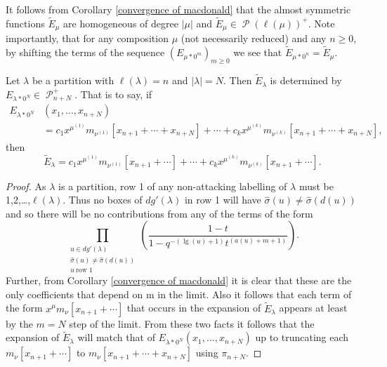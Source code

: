 \documentclass[ALCO,Unicode]{cedram}
\DeclareMathOperator{\sP}{\mathscr{P} }
\DeclareMathOperator{\mathleg}{lg}
\begin{document}
It follows from Corollary \ref{convergence of macdonald} that the almost symmetric functions $\widetilde{E}_{\mu}$ are homogeneous of degree $|\mu|$ and $\widetilde{E}_{\mu} \in \sP(\ell(\mu))^{+}.$ Note importantly, that for any composition $\mu$ (not necessarily reduced) and any $n \geq 0$, by shifting the terms of the sequence $(E_{\mu*0^m})_{m\geq 0}$ we see that $\widetilde{E}_{\mu *0^n} = \widetilde{E}_{\mu}$.



\begin{coro}\label{stabilizing of convergence of macdonald for partitions}
Let $\lambda$ be a partition with $\ell(\lambda) = n$ and $|\lambda| = N$. Then $\widetilde{E}_{\lambda}$ is determined by  $E_{\lambda*0^N} \in \sP_{n+N}^{+}$. That is to say, if 
\begin{align*}
E_{\lambda*0^{N}}&(x_1,\ldots,x_{n+N}) \\ &= c_1 x^{\mu^{(1)}}m_{\nu^{(1)}}[x_{n+1}+\cdots+x_{n+N}] + \cdots + c_k x^{\mu^{(k)}}m_{\nu^{(k)}}[x_{n+1}+ \cdots +x_{n+N}],
\end{align*}
then 
$$ \widetilde{E}_{\lambda} = c_1 x^{\mu^{(1)}}m_{\nu^{(1)}}[x_{n+1}+ \cdots] + \cdots + c_k x^{\mu^{(k)}}m_{\nu^{(k)}}[x_{n+1}+ \cdots] .$$
\end{coro}

\begin{proof}
As $\lambda$ is a partition, row 1 of any non-attacking labelling of $\lambda$ must be 1,2,\ldots,$\ell(\lambda)$. Thus no boxes of $dg'(\lambda)$ in row 1 will have $\widehat{\sigma}(u) \neq \widehat{\sigma}(d(u))$ and so there will be no contributions from any of the terms of the form 
$$\prod_{\substack{ u \in dg'(\lambda) \\ \widehat{\sigma}(u) \neq \widehat{\sigma}(d(u)) \\ u ~ \text{row } 1 }} \left( \frac{1-t}{1-q^{-(\mathleg(u) +1)}t^{(a(u) + m + 1)}} \right).$$ Further, from  Corollary \ref{convergence of macdonald} it is clear that these are the only coefficients that depend on m in the limit. Also it follows that each term of the form $x^{\mu}m_{\nu}[x_{n+1}+ \cdots]$ that occurs in the expansion of $\widetilde{E}_{\lambda}$ appears at least by the $m = N$ step of the limit. From these two facts it follows that the expansion of $\widetilde{E}_{\lambda}$ will match that of $E_{\lambda*0^{N}}(x_1,\ldots,x_{n+N})$ up to truncating each $m_{\nu}[x_{n+1}+ \cdots]$ to $m_{\nu}[x_{n+1}+\cdots + x_{n+N}]$ using $\pi_{n+N}.$
\end{proof}
\end{document}
